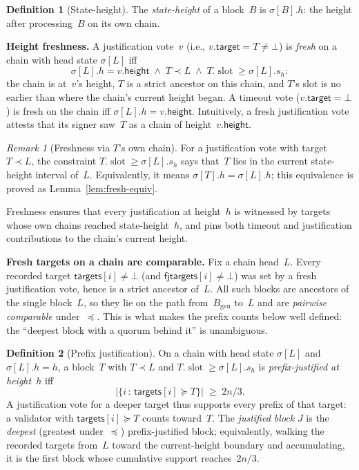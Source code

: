 \ifx\litemode\undefined\documentclass{article}\fi
\newcommand{\genesis}{\ensuremath{B_{\mathrm{gen}}}}
\newcommand{\slot}[0]{\ensuremath{\operatorname{\mathrm{slot}}}}
\newcommand{\target}{\mathsf{target}}
\newcommand{\height}{\mathsf{height}}
\newcommand{\targets}{\mathsf{targets}}
\newcommand{\fjtargets}{\mathsf{fjtargets}}
\renewcommand{\paragraph}[1]{\vspace{7pt}\noindent\textbf{#1}}
\theoremstyle{plain}
\theoremstyle{definition}
\newtheorem{definition}{Definition}
\theoremstyle{remark}
\newtheorem{remark}[theorem]{Remark}
\begin{document}
\begin{definition}[State-height]\label{def:sheight}
The \emph{state-height} of a block~$B$ is $\sigma[B].h$: the height after processing~$B$ on its own chain.
\end{definition}

\paragraph{Height freshness.}
A justification vote~$v$ (i.e., $v.\target = T \neq \bot$) is \emph{fresh} on a chain with head state $\sigma[L]$ iff
\[
  \sigma[L].h = v.\height \;\wedge\; T \prec L \;\wedge\; T.\slot \geq \sigma[L].s_h:
\]
the chain is at~$v$'s height, $T$ is a strict ancestor on this chain, and $T$'s slot is no earlier than where the chain's current height began.
A timeout vote ($v.\target = \bot$) is fresh on the chain iff $\sigma[L].h = v.\height$.
Intuitively, a fresh justification vote attests that its signer saw~$T$ as a chain of height~$v.\height$.

\begin{remark}[Freshness via $T$'s own chain]
For a justification vote with target $T \prec L$, the constraint $T.\slot \geq \sigma[L].s_h$ says that~$T$ lies in the current state-height interval of~$L$.
Equivalently, it means $\sigma[T].h = \sigma[L].h$; this equivalence is proved as Lemma~\ref{lem:fresh-equiv}.
\end{remark}

Freshness ensures that every justification at height~$h$ is witnessed by targets whose own chains reached state-height~$h$, and pins both timeout and justification contributions to the chain's current height.

\paragraph{Fresh targets on a chain are comparable.}
Fix a chain head~$L$.
Every recorded target $\targets[i] \neq \bot$ (and $\fjtargets[i] \neq \bot$) was set by a fresh justification vote, hence is a strict ancestor of~$L$.
All such blocks are ancestors of the single block~$L$, so they lie on the path from~$\genesis$ to~$L$ and are \emph{pairwise comparable} under~$\preceq$.
This is what makes the prefix counts below well defined: the ``deepest block with a quorum behind it'' is unambiguous.

\begin{definition}[Prefix justification]\label{def:justification}
On a chain with head state $\sigma[L]$ and $\sigma[L].h = h$, a block~$T$ with $T \prec L$ and $T.\slot \geq \sigma[L].s_h$ is \emph{prefix-justified at height~$h$} iff
\[
  \bigl|\{i \,:\, \targets[i] \succeq T\}\bigr| \;\geq\; 2n/3 .
\]
A justification vote for a deeper target thus supports every prefix of that target: a validator with $\targets[i] \succeq T$ counts toward~$T$.
The \emph{justified block} $J$ is the \emph{deepest} (greatest under~$\preceq$) prefix-justified block; equivalently, walking the recorded targets from~$L$ toward the current-height boundary and accumulating, it is the first block whose cumulative support reaches~$2n/3$.
\end{definition}
\end{document}

